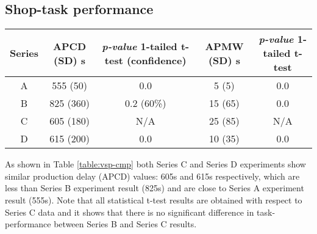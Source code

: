 \documentclass[journal]{IEEEtran}
\begin{document}
\subsection{Shop-task performance}
\vspace*{-0.1cm}
\begin{table*}
\begin{small}
\centering
\caption{Shop-floor task performance}
\begin{tabular}{|c|c|c|c|c|}
\hline Series & APCD  (SD) s & \textit{p-value} 1-tailed t-test (confidence) & APMW (SD) s & \textit{p-value}  1-tailed t-test \\ 
\hline A & 555 (50) & 0.0 & 5 (5) & 0.0\\ 
\hline B & 825 (360) & 0.2 (60\%) & 15 (65) & 0.0 \\
\hline C & 605 (180) & N/A & 25 (85) & N/A\\
\hline D  & 615 (200) & 0.0 & 10 (35) & 0.0\\
\hline
\end{tabular}
\label{table:vsp-cmp} 
\end{small}
\end{table*}
As shown in Table \ref{table:vsp-cmp}  both Series C and Series D experiments show similar production delay (APCD) values: 605s and 615s respectively, which are less than Series B experiment result (825s) and are close to Series A experiment result (555s). Note that all statistical t-test results are obtained with respect to Series C data and it shows that there is no significant difference in task-performance between Series B and Series C results.
\vspace*{-0.2cm}
\end{document}
